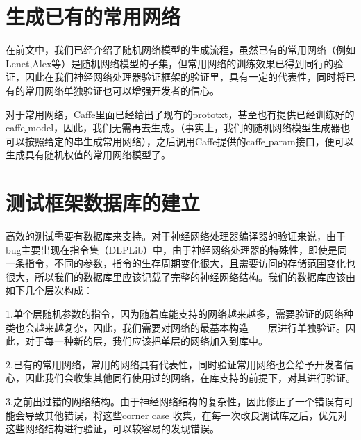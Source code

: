 \section{生成已有的常用网络}
在前文中，我们已经介绍了随机网络模型的生成流程，虽然已有的常用网络（例如Lenet,Alex等）是随机网络模型的子集，但常用网络的训练效果已得到同行的验证，因此在我们神经网络处理器验证框架的验证里，具有一定的代表性，同时将已有的常用网络单独验证也可以增强开发者的信心。

对于常用网络，Caffe里面已经给出了现有的prototxt，甚至也有提供已经训练好的caffe\underline{ }model，因此，我们无需再去生成。（事实上，我们的随机网络模型生成器也可以按照给定的串生成常用网络），之后调用Caffe提供的caffe\underline{ }param接口，便可以生成具有随机权值的常用网络模型了。

\section{测试框架数据库的建立}
高效的测试需要有数据库来支持。对于神经网络处理器编译器的验证来说，由于bug主要出现在指令集（DLPLib）中，由于神经网络处理器的特殊性，即使是同一条指令，不同的参数，指令的生存周期变化很大，且需要访问的存储范围变化也很大，所以我们的数据库里应该记载了完整的神经网络结构。我们的数据库应该由如下几个层次构成：

1.单个层随机参数的指令，因为随着库能支持的网络越来越多，需要验证的网络种类也会越来越复杂，因此，我们需要对网络的最基本构造——层进行单独验证。因此，对于每一种新的层，我们应该把单层的网络加入到库中。

2.已有的常用网络，常用的网络具有代表性，同时验证常用网络也会给予开发者信心，因此我们会收集其他同行使用过的网络，在库支持的前提下，对其进行验证。

3.之前出过错的网络结构。由于神经网络结构的复杂性，因此修正了一个错误有可能会导致其他错误，将这些corner case 收集，在每一次改良调试库之后，优先对这些网络结构进行验证，可以较容易的发现错误。